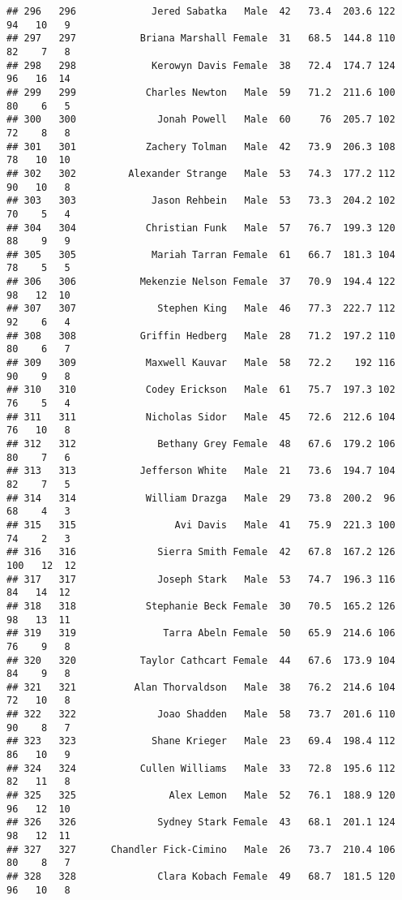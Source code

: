 \documentclass[
]{article}
\begin{document}
\begin{verbatim}
## 296   296             Jered Sabatka   Male  42   73.4  203.6 122  94   10   9
## 297   297           Briana Marshall Female  31   68.5  144.8 110  82    7   8
## 298   298             Kerowyn Davis Female  38   72.4  174.7 124  96   16  14
## 299   299            Charles Newton   Male  59   71.2  211.6 100  80    6   5
## 300   300              Jonah Powell   Male  60     76  205.7 102  72    8   8
## 301   301            Zachery Tolman   Male  42   73.9  206.3 108  78   10  10
## 302   302         Alexander Strange   Male  53   74.3  177.2 112  90   10   8
## 303   303             Jason Rehbein   Male  53   73.3  204.2 102  70    5   4
## 304   304            Christian Funk   Male  57   76.7  199.3 120  88    9   9
## 305   305             Mariah Tarran Female  61   66.7  181.3 104  78    5   5
## 306   306           Mekenzie Nelson Female  37   70.9  194.4 122  98   12  10
## 307   307              Stephen King   Male  46   77.3  222.7 112  92    6   4
## 308   308           Griffin Hedberg   Male  28   71.2  197.2 110  80    6   7
## 309   309            Maxwell Kauvar   Male  58   72.2    192 116  90    9   8
## 310   310            Codey Erickson   Male  61   75.7  197.3 102  76    5   4
## 311   311            Nicholas Sidor   Male  45   72.6  212.6 104  76   10   8
## 312   312              Bethany Grey Female  48   67.6  179.2 106  80    7   6
## 313   313           Jefferson White   Male  21   73.6  194.7 104  82    7   5
## 314   314            William Drazga   Male  29   73.8  200.2  96  68    4   3
## 315   315                 Avi Davis   Male  41   75.9  221.3 100  74    2   3
## 316   316              Sierra Smith Female  42   67.8  167.2 126 100   12  12
## 317   317              Joseph Stark   Male  53   74.7  196.3 116  84   14  12
## 318   318            Stephanie Beck Female  30   70.5  165.2 126  98   13  11
## 319   319               Tarra Abeln Female  50   65.9  214.6 106  76    9   8
## 320   320           Taylor Cathcart Female  44   67.6  173.9 104  84    9   8
## 321   321          Alan Thorvaldson   Male  38   76.2  214.6 104  72   10   8
## 322   322              Joao Shadden   Male  58   73.7  201.6 110  90    8   7
## 323   323             Shane Krieger   Male  23   69.4  198.4 112  86   10   9
## 324   324           Cullen Williams   Male  33   72.8  195.6 112  82   11   8
## 325   325                Alex Lemon   Male  52   76.1  188.9 120  96   12  10
## 326   326              Sydney Stark Female  43   68.1  201.1 124  98   12  11
## 327   327      Chandler Fick-Cimino   Male  26   73.7  210.4 106  80    8   7
## 328   328              Clara Kobach Female  49   68.7  181.5 120  96   10   8

\end{verbatim}
\end{document}
